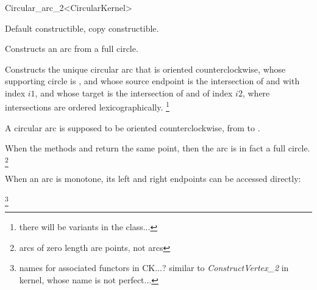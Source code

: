 \begin{ccRefClass}{Circular_arc_2<CircularKernel>}

\ccDefinition


\ccParameters


\ccCreation
{}

Default constructible, copy constructible.

\ccThreeToTwo

{Constructs an arc from a full circle.}

{Constructs the unique circular arc that is oriented counterclockwise,
whose supporting circle is , and whose source endpoint is the
intersection of  and  with index $i1$, and whose target
is the intersection of  and  of index $i2$, where
intersections are ordered lexicographically.
} 
\footnote{there will be variants in the class...}

\ccAccessFunctions

\ccThreeToTwo


A circular arc is supposed to be oriented counterclockwise, from 
 to . 

\ccGlue
{}

When the methods  and  return the same point, then 
the arc is in fact a full circle. \footnote{arcs of zero length are
points, not arcs}

When an arc is monotone, its left and right endpoints can be accessed directly:

\ccGlue
{}
\footnote{names for associated functors in CK...? similar to
\textit{ConstructVertex\_2} in kernel, whose name is not perfect...}

\ccQueryFunctions



\ccGlue
{}

\end{ccRefClass}
